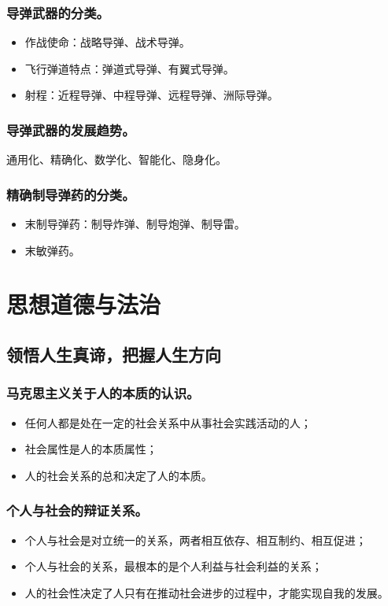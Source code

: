 \documentclass{article}
\begin{document}
\subsubsection{导弹武器的分类。}
\begin{itemize}
    \item 作战使命：战略导弹、战术导弹。
    \item 飞行弹道特点：弹道式导弹、有翼式导弹。
    \item 射程：近程导弹、中程导弹、远程导弹、洲际导弹。
\end{itemize}

\subsubsection{导弹武器的发展趋势。}
通用化、精确化、数学化、智能化、隐身化。

\subsubsection{精确制导弹药的分类。}
\begin{itemize}
    \item 末制导弹药：制导炸弹、制导炮弹、制导雷。
    \item 末敏弹药。
\end{itemize}

\newpage

\section{思想道德与法治}

\subsection{领悟人生真谛，把握人生方向}

\subsubsection{马克思主义关于人的本质的认识。}
\begin{itemize}
    \item 任何人都是处在一定的社会关系中从事社会实践活动的人；
    \item 社会属性是人的本质属性；
    \item 人的社会关系的总和决定了人的本质。
\end{itemize}

\subsubsection{个人与社会的辩证关系。}
\begin{itemize}
    \item 个人与社会是对立统一的关系，两者相互依存、相互制约、相互促进；
    \item 个人与社会的关系，最根本的是个人利益与社会利益的关系；
    \item 人的社会性决定了人只有在推动社会进步的过程中，才能实现自我的发展。
\end{itemize}
\end{document}
